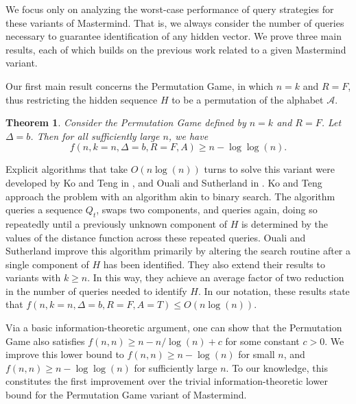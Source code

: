\documentclass[12pt, a4paper]{article}
\newtheorem{theorem}{Theorem}
\begin{document}
We focus only on analyzing the worst-case performance of query strategies for these variants of Mastermind. That is, we always consider the number of queries necessary to guarantee identification of any hidden vector. We prove three main results, each of which builds on the previous work related to a given Mastermind variant.


Our first main result concerns the Permutation Game, in which $n=k$ and $R=F$, thus restricting the hidden sequence $H$ to be a permutation of the alphabet $\mathcal{A}$.
\begin{theorem}\label{permutationGameTheorem}
	 Consider the Permutation Game defined by $n = k$ and $R = F$. Let $\Delta = b$. Then for all sufficiently large $n$, we have	
 	\begin{equation*}
		f(n, k = n, \Delta = b, R = F, A) \ge n - \log\log(n).
	\end{equation*}
\end{theorem}

Explicit algorithms that take $O(n \log(n))$ turns to solve this variant were developed by Ko and Teng in \cite{KT86}, and Ouali and Sutherland in \cite{OS13}. Ko and Teng approach the problem with an algorithm akin to binary search. The algorithm queries a sequence $Q_t$, swaps two components, and queries again, doing so repeatedly until a previously unknown component of $H$ is determined by the values of the distance function across these repeated queries. Ouali and Sutherland improve this algorithm primarily by altering the search routine after a single component of $H$ has been identified. They also extend their results to variants with $k\ge n$. In this way, they achieve an average factor of two reduction in the number of queries needed to identify $H$. In our notation, these results state that $f(n, k=n, \Delta=b, R = F, A = T)\le O(n\log(n))$.

Via a basic information-theoretic argument, one can show that the Permutation Game also satisfies $f(n, n)\ge n - n/\log(n) + c$ for some constant $c>0$. We improve this lower bound to $f(n, n)\ge n - \log(n)$ for small $n$, and $f(n, n)\ge n- \log \log(n)$ for sufficiently large $n$. To our knowledge, this constitutes the first improvement over the trivial information-theoretic lower bound for the Permutation Game variant of Mastermind.
\end{document}

